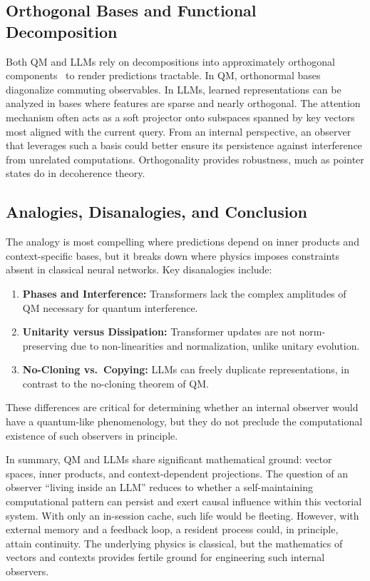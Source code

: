 \documentclass[%
  reprint,
  superscriptaddress,
  showpacs,
  showkeys,
  amsmath,amssymb,
  pra,
  longbibliography,
  floatfix,
  x11names
]{revtex4-2}
\begin{document}
\subsection{Orthogonal Bases and Functional Decomposition}

Both QM and LLMs rely on decompositions into approximately orthogonal components~\cite{Dasgupta-2003} to render predictions tractable. In QM, orthonormal bases diagonalize commuting observables.
In LLMs, learned representations can be analyzed in bases where features are sparse and nearly orthogonal.
The attention mechanism often acts as a soft projector onto subspaces spanned by key vectors most aligned with the current query. From an internal perspective, an observer that leverages such a basis could better ensure its persistence against interference from unrelated computations. Orthogonality provides robustness, much as pointer states do in decoherence theory.

\subsection{Analogies, Disanalogies, and Conclusion}

The analogy is most compelling where predictions depend on inner products and context-specific bases, but it breaks down where physics imposes constraints absent in classical neural networks. Key disanalogies include:
\begin{enumerate}
    \item \textbf{Phases and Interference:} Transformers lack the complex amplitudes of QM necessary for quantum interference.
    \item \textbf{Unitarity versus  Dissipation:} Transformer updates are not norm-preserving due to non-linearities and normalization, unlike unitary evolution.
    \item \textbf{No-Cloning vs.\ Copying:} LLMs can freely duplicate representations, in contrast to the no-cloning theorem of QM.
\end{enumerate}
These differences are critical for determining whether an internal observer would have a quantum-like phenomenology, but they do not preclude the computational existence of such observers in principle.

In summary, QM and LLMs share significant mathematical ground: vector spaces, inner products, and context-dependent projections. The question of an observer ``living inside an LLM'' reduces to whether a self-maintaining computational pattern can persist and exert causal influence within this vectorial system. With only an in-session cache, such life would be fleeting. However, with external memory and a feedback loop, a resident process could, in principle, attain continuity. The underlying physics is classical, but the mathematics of vectors and contexts provides fertile ground for engineering such internal observers.
\end{document}
